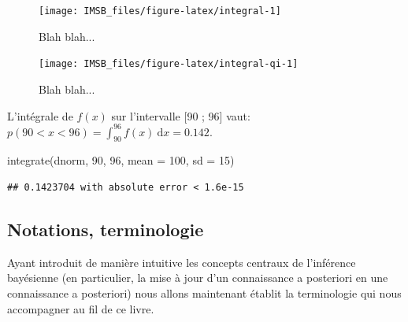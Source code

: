 \documentclass[
  a4paper,11pt,twoside,onecolumn,openright,final,oldfontcommands]{memoir}
\newenvironment{Shaded}{\begin{snugshade}}{\end{snugshade}}
\newcommand{\AttributeTok}[1]{\textcolor[rgb]{0.77,0.63,0.00}{#1}}
\newcommand{\DecValTok}[1]{\textcolor[rgb]{0.00,0.00,0.81}{#1}}
\newcommand{\FunctionTok}[1]{\textcolor[rgb]{0.00,0.00,0.00}{#1}}
\newcommand{\NormalTok}[1]{#1}
\theoremstyle{definition}
\theoremstyle{definition}
\theoremstyle{definition}
\theoremstyle{definition}
\theoremstyle{remark}
\begin{document}
\begin{figure}[!htb]

{\centering \texttt{[image: IMSB\_files/figure-latex/integral-1]} 

}

\caption{Blah blah...}\label{fig:integral}
\end{figure}

\begin{figure}[!htb]

{\centering \texttt{[image: IMSB\_files/figure-latex/integral-qi-1]} 

}

\caption{Blah blah...}\label{fig:integral-qi}
\end{figure}

L'intégrale de \(f(x)\) sur l'intervalle {[}90 ; 96{]} vaut: \(p(90 < x < 96) = \int_{90}^{96} f(x) \ \mathrm{d}x = 0.142\).

\begin{Shaded}
\begin{Highlighting}[]
\FunctionTok{integrate}\NormalTok{(dnorm, }\DecValTok{90}\NormalTok{, }\DecValTok{96}\NormalTok{, }\AttributeTok{mean =} \DecValTok{100}\NormalTok{, }\AttributeTok{sd =} \DecValTok{15}\NormalTok{)}
\end{Highlighting}
\end{Shaded}

\begin{verbatim}
## 0.1423704 with absolute error < 1.6e-15
\end{verbatim}

\hypertarget{notations-terminologie}{%
\subsection{Notations, terminologie}\label{notations-terminologie}}

Ayant introduit de manière intuitive les concepts centraux de l'inférence bayésienne (en particulier, la mise à jour d'un connaissance a posteriori en une connaissance a posteriori) nous allons maintenant établit la terminologie qui nous accompagner au fil de ce livre.
\end{document}
